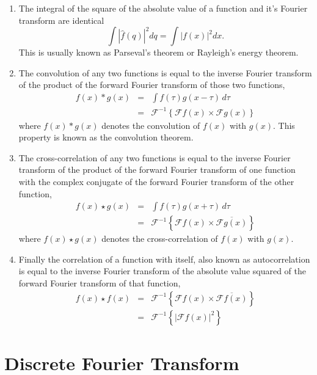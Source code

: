 \begin{enumerate}
\item The integral of the square of the absolute value of a function and it's Fourier transform are identical
\begin{equation}
\int |\hat{f}(q)|^2 dq = \int |f(x)|^2 dx.
\end{equation}
This is usually known as Parseval's theorem or Rayleigh's energy theorem.

\item The convolution of any two functions is equal to the inverse Fourier transform of the product of the forward Fourier transform of those two functions,
\begin{eqnarray}
f(x) * g(x) & = & \int f(\tau) g(x-\tau) \, d\tau \nonumber \\
& = & \mathscr{F}^{-1}\left\{\mathscr{F}f(x) \times \mathscr{F}g(x)\right\}
\end{eqnarray}
where $f(x) * g(x)$ denotes the convolution of $f(x)$ with $g(x)$. This property
is known as the convolution theorem.

\item The cross-correlation of any two functions is equal to the inverse Fourier
  transform of the product of the forward Fourier transform of one function with
  the complex conjugate of the forward Fourier transform of the other function,
\begin{eqnarray}
f(x) \star g(x) & = & \int f(\tau) g(x+\tau) \, d\tau \nonumber \\ 
& = & \mathscr{F}^{-1}\left\{\mathscr{F}f(x) \times \overline{\mathscr{F}g(x)}\right\}
\end{eqnarray}
where $f(x) \star g(x)$ denotes the cross-correlation of $f(x)$ with $g(x)$.
 
\item Finally the correlation of a function with itself, also known as
  autocorrelation is equal to the inverse Fourier transform of the absolute
  value squared of the forward Fourier transform of that function,
  \begin{eqnarray}
f(x) \star f(x) & = & \mathscr{F}^{-1}\left\{\mathscr{F}f(x) 
  \times \overline{\mathscr{F}f(x)}\right\} \nonumber \\
& = & \mathscr{F}^{-1}\left\{|\mathscr{F}f(x)|^2\right\}
\end{eqnarray}
\end{enumerate}

\section{Discrete Fourier Transform}

